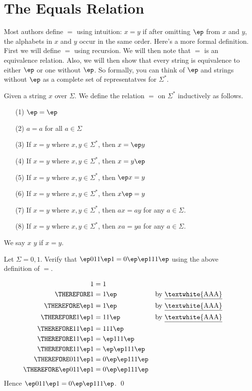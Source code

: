 \section{The Equals Relation}

Most authors define $=$ using intuition: $x=y$ if after omitting
$\ep$ from $x$ and $y$, the alphabets in $x$ and $y$ occur in the
same order. Here's a more formal definition. First we will define
$=$ using recursion. We will then note that $=$ is an equivalence
relation. Also, we will then show that every string is equivalence
to either $\ep$ or one without $\ep$. So formally, you can think of
$\ep$ and strings without $\ep$ as a complete set of representatves
for $\Sigma^*$.

\begin{defn}
Given a string $x$ over $\Sigma$. We define the relation $=$ on
$\Sigma^*$ inductively as follows.
\begin{itemize}
\item[(1)] $\ep = \ep$
\item[(2)] $a = a$ for all $a \in \Sigma$
\item[(3)] If $x = y$ where $x,y \in \Sigma^*$, then $x = \ep y$
\item[(4)] If $x = y$ where $x,y \in \Sigma^*$, then $x = y \ep$
\item[(5)] If $x = y$ where $x,y \in \Sigma^*$, then $\ep x = y$
\item[(6)] If $x = y$ where $x,y \in \Sigma^*$, then $x \ep = y$
\item[(7)] If $x = y$ where $x,y \in \Sigma^*$, then $ax = ay$ for any $a \in \Sigma$.
\item[(8)] If $x = y$ where $x,y \in \Sigma^*$, then $xa = ya$ for any $a \in \Sigma$.
\end{itemize}
We say $x$  $y$
if $x=y$.
\end{defn}



\newpage
\begin{ex}
Let $\Sigma = {0,1}$. Verify that $\ep 011 \ep 1 = 0 \ep\ep 111
\ep$ using the above definition of $=$.
\end{ex}

\SOLUTION
\begin{align*}
 1 &= 1 \cr
\THEREFORE         1 &= 1\ep                  & & \text{by \underline{\textwhite{AAA}}} \cr
\THEREFORE     \ep 1 &= 1\ep                  & & \text{by \underline{\textwhite{AAA}}} \cr
\THEREFORE   1 \ep 1 &= 11 \ep                & & \text{by \underline{\textwhite{AAA}}} \cr
\THEREFORE  11 \ep 1 &= 111 \ep                 \cr
\THEREFORE  11 \ep 1 &= \ep 111 \ep             \cr
\THEREFORE  11 \ep 1 &= \ep\ep 111 \ep          \cr
\THEREFORE 011 \ep 1 &= 0 \ep\ep 111 \ep        \cr
\THEREFORE \ep 011 \ep 1 &= 0 \ep\ep 111 \ep    \cr
\end{align*}
Hence $\ep 011 \ep 1 = 0 \ep\ep 111 \ep$.
\qed


